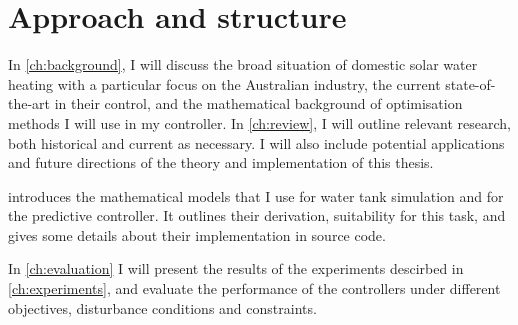 \section{Approach and structure}

In \autoref{ch:background}, I will discuss the broad situation of domestic solar water heating with a particular focus on the Australian industry, the current state-of-the-art in their control, and the mathematical background of optimisation methods I will use in my controller.
In \autoref{ch:review}, I will outline relevant research, both historical and current as necessary.
I will also include potential applications and future directions of the theory and implementation of this thesis.

 introduces the mathematical models that I use for water tank simulation and for the predictive controller.
It outlines their derivation, suitability for this task, and gives some details about their implementation in source code.

In \autoref{ch:evaluation} I will present the results of the experiments descirbed in \autoref{ch:experiments}, and evaluate the performance of the controllers under different objectives, disturbance conditions and constraints.

